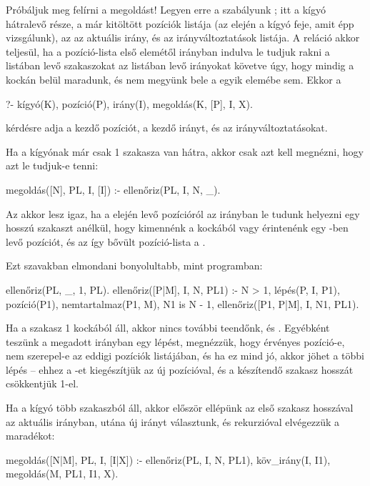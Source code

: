 Próbáljuk meg felírni a megoldást! Legyen erre a
szabályunk ; itt  a
kígyó hátralevő része,  a már kitöltött
pozíciók listája (az elején a kígyó feje, amit épp
vizsgálunk), az  az aktuális irány, és 
az irányváltoztatások listája. A reláció akkor
teljesül, ha a  pozíció-lista első elemétől
 irányban indulva le tudjuk rakni a 
listában levő szakaszokat az  listában levő
irányokat követve úgy, hogy mindig a kockán belül
maradunk, és nem megyünk bele a  egyik
elemébe sem. Ekkor a
\begin{query}
?- kígyó(K), pozíció(P), irány(I),
   megoldás(K, [P], I, X).
\end{query}
kérdésre  adja a kezdő pozíciót,  a
kezdő irányt, és  az irányváltoztatásokat.

Ha a kígyónak már csak 1 szakasza van hátra, akkor
csak azt kell megnézni, hogy azt le tudjuk-e tenni:
\begin{program}
megoldás([N], PL, I, [I]) :- ellenőriz(PL, I, N, _).
\end{program}
Az  akkor lesz igaz, ha
a  elején levő pozícióról az  irányban
le tudunk helyezni egy  hosszú szakaszt
anélkül, hogy kimennénk a kockából vagy érintenénk
egy -ben levő pozíciót, és az így bővült
pozíció-lista a .

Ezt szavakban elmondani bonyolultabb, mint
programban:
\begin{program}
ellenőriz(PL, _, 1, PL).
ellenőriz([P|M], I, N, PL1) :-
    N > 1, lépés(P, I, P1),
    pozíció(P1), nemtartalmaz(P1, M), N1 is N - 1,
    ellenőriz([P1, P|M], I, N1, PL1).
\end{program}
Ha a szakasz 1 kockából áll, akkor nincs további
teendőnk, és . Egyébként teszünk a
megadott irányban egy lépést, megnézzük, hogy
érvényes pozíció-e, nem szerepel-e az eddigi
pozíciók listájában, és ha ez mind jó, akkor jöhet a
többi lépés -- ehhez a -et kiegészítjük az új
 pozícióval, és a készítendő szakasz hosszát
csökkentjük 1-el.

Ha a kígyó több szakaszból áll, akkor először
ellépünk az első szakasz hosszával az aktuális
irányban, utána új irányt választunk, és rekurzióval
elvégezzük a maradékot:
\begin{program}
megoldás([N|M], PL, I, [I|X]) :-
    ellenőriz(PL, I, N, PL1), köv_irány(I, I1), 
    megoldás(M, PL1, I1, X).
\end{program}


